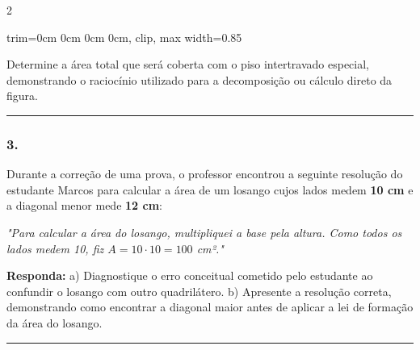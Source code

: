 \documentclass[twoside, 10pt, a4paper]{article}
\newlength{\espacoPreQuestao}\setlength{\espacoPreQuestao}{0.1cm}
\newlength{\espacoQuestao}\setlength{\espacoQuestao}{0.2cm}
\newcommand{\larguraTikz}{0.85\linewidth}
\begin{document}
\begin{multicols*}{2}
\begin{center}
\begin{adjustbox}{trim=0cm 0cm 0cm 0cm, clip, max width=\larguraTikz}
\end{adjustbox}
\end{center}
Determine a área total que será coberta com o piso intertravado especial, demonstrando o raciocínio utilizado para a decomposição ou cálculo direto da figura.
\par\vspace{\espacoQuestao}

\noindent\textcolor{CorLinha}{\rule{\linewidth}{0.5pt}}
\par\vspace{\espacoPreQuestao}
\subsubsection*{3.} Durante a correção de uma prova, o professor encontrou a seguinte resolução do estudante Marcos para calcular a área de um losango cujos lados medem \textbf{10 cm} e a diagonal menor mede \textbf{12 cm}:

\textit{"Para calcular a área do losango, multipliquei a base pela altura. Como todos os lados medem 10, fiz $A = 10 \cdot 10 = 100$ cm²."}

\begin{boxresponda}
\textbf{Responda:} 
a) Diagnostique o erro conceitual cometido pelo estudante ao confundir o losango com outro quadrilátero.
b) Apresente a resolução correta, demonstrando como encontrar a diagonal maior antes de aplicar a lei de formação da área do losango.
\end{boxresponda}
\par\vspace{\espacoQuestao}

\noindent\textcolor{CorLinha}{\rule{\linewidth}{0.5pt}} 
\par\vspace{\espacoPreQuestao}

\end{multicols*}
\end{document}
